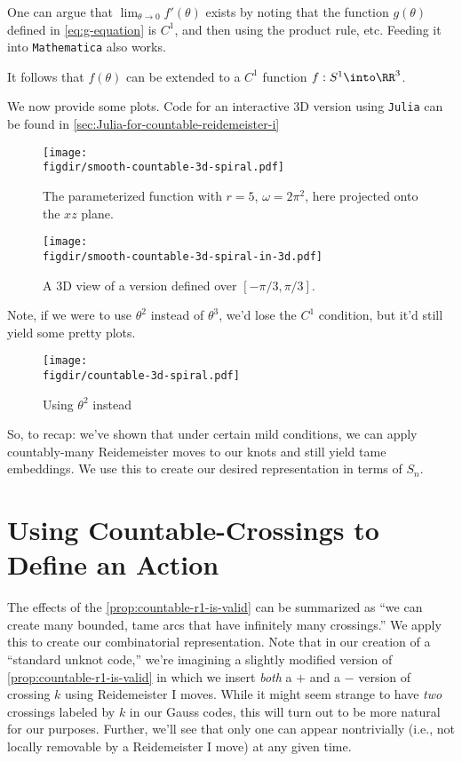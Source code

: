 \begin{sproof}
  One can argue that $\lim_{\theta \to 0} f'(\theta)$ exists by noting
  that the function $g(\theta)$ defined in \cref{eq:g-equation} is
  $C^1$, and then using the product rule, etc. Feeding it into
  \texttt{Mathematica} also works.

  It follows that $f(\theta)$ can be extended to a $C^1$ function $f :
  S^1 \into \RR^3$.
\end{sproof}
We now provide some plots. Code for an interactive 3D version using
\texttt{Julia} can be found in
\cref{sec:Julia-for-countable-reidemeister-i}
\begin{figure}[H]
  \centering
  \texttt{[image: \\figdir/smooth-countable-3d-spiral.pdf]}
  \caption[Parameterized countable Reidemeister I]{The parameterized
    function with $r=5$, $\omega=2\pi^2$, here projected onto the $xz$
    plane.}
\end{figure}
\begin{figure}[H]
  \centering
  \texttt{[image: \\figdir/smooth-countable-3d-spiral-in-3d.pdf]}
  \caption[A 3D view]{A $3$D view of a version defined over $[-\pi/3,
    \pi/3]$.}
  \label{fig:3d-countable-reidemeister-i-plot}
\end{figure}
Note, if we were to use $\theta^2$ instead of $\theta^3$, we'd lose
the $C^1$ condition, but it'd still yield some pretty plots.
\begin{figure}[H]
  \centering
  \texttt{[image: \\figdir/countable-3d-spiral.pdf]}
  \caption{Using $\theta^2$ instead}
\end{figure}
So, to recap: we've shown that under certain mild conditions, we can
apply countably-many Reidemeister moves to our knots and still yield
tame embeddings. We use this to create our desired representation in
terms of $S_n$.


\section{Using Countable-Crossings to Define an
  Action}\label{sec:defining-the-action}
The effects of the \cref{prop:countable-r1-is-valid} can be summarized
as ``we can create many bounded, tame arcs that have infinitely many
crossings.'' We apply this to create our combinatorial representation.
Note that in our creation of a ``standard unknot code,'' we're
imagining a slightly modified version of
\cref{prop:countable-r1-is-valid} in which we insert \emph{both} a $+$
and a $-$ version of crossing $k$ using Reidemeister I moves. While it
might seem strange to have \emph{two} crossings labeled by $k$ in our
Gauss codes, this will turn out to be more natural for our purposes.
Further, we'll see that only one can appear nontrivially (i.e., not
locally removable by a Reidemeister I move) at any given time.

